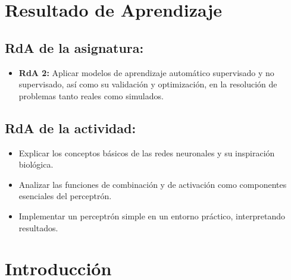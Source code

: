 \documentclass[a4,11pt]{aleph-notas}
\begin{document}
\encabezado


\section*{Resultado de Aprendizaje}

\subsection*{RdA de la asignatura:}
\begin{itemize}[leftmargin=*]
    \item \textbf{RdA 2:} Aplicar modelos de aprendizaje automático supervisado y no supervisado, así como su validación y optimización, en la resolución de problemas tanto reales como simulados.
\end{itemize}

\subsection*{RdA de la actividad:}
\begin{itemize}[leftmargin=*]
    \item Explicar los conceptos básicos de las redes neuronales y su inspiración biológica.
    \item Analizar las funciones de combinación y de activación como componentes esenciales del perceptrón.
    \item Implementar un perceptrón simple en un entorno práctico, interpretando resultados.
\end{itemize}

\section*{Introducción}
\end{document}

